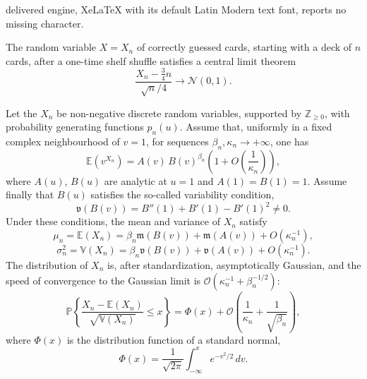 \documentclass[10pt,a4paper]{amsart}
\def\E{{\mathbb {E}}}
\newcommand{\fm}{\ensuremath{\mathfrak{m}}}
\newcommand{\fv}{\ensuremath{\mathfrak{v}}}
\begin{document}
delivered engine, XeLaTeX with its default Latin Modern text font, reports no missing character.
\begin{theorem}
\label{the:main}
The random variable $X=X_n$ of correctly guessed cards, starting with a deck of $n$ cards, after a one-time shelf shuffle satisfies
a central limit theorem
\[
\frac{X_n-\frac34 n}{\sqrt{n}/4}\to \mathcal{N}(0,1). 
\]
\end{theorem}

\begin{theorem}
Let the $X_n$ be non-negative discrete random variables, supported by $\mathbb{Z}_{\ge 0}$, with probability generating functions $p_n(u)$. Assume that,
uniformly in a fixed complex neighbourhood of $v = 1$, for sequences
$\beta_n, \kappa_n \to +\infty$, one has
\begin{equation*}
\E(v^{X_n})=  A(v)\, B(v)^{\beta_n} \left( 1 + O\!\left( \frac{1}{\kappa_n} \right) \right),
\end{equation*}
where $A(u)$, $B(u)$ are analytic at $u = 1$ and $A(1) = B(1) = 1$.
Assume finally that $B(u)$ satisfies the so-called variability condition,
\[
\fv(B(v))=B''(1) + B'(1) - B'(1)^2 \neq 0.
\]
Under these conditions, the mean and variance of $X_n$ satisfy
\begin{equation*}
\mu_n = \mathbb{E}(X_n)
= \beta_n \fm(B(v)) + \fm(A(v)) + O\!\left( \kappa_n^{-1} \right),
\end{equation*}
\begin{equation*}
\sigma_n^2 = \mathbb{V}(X_n)
= \beta_n \fv(B(v)) + \fv(A(v)) + O\!\left( \kappa_n^{-1} \right).
\end{equation*}
The distribution of $X_n$ is, after standardization, asymptotically Gaussian, and the
speed of convergence to the Gaussian limit is $\mathcal{O}\left( \kappa_n^{-1} + \beta_n^{-1/2} \right)$:
\begin{equation*}
\mathbb{P}\left\{
\frac{X_n - \mathbb{E}(X_n)}{\sqrt{\mathbb{V}(X_n)}} \le x
\right\}
=\Phi(x)+\mathcal{O}\left(\frac{1}{\kappa_n}+\frac{1}{\sqrt{\beta_n}}\right),
\end{equation*}
where $\Phi(x)$ is the distribution function of a standard normal,
\[
\Phi(x)=\frac{1}{\sqrt{2\pi}}
\int_{-\infty}^{x}
e^{-v^2/2}\, dv.
\]
\end{theorem}
\end{document}
